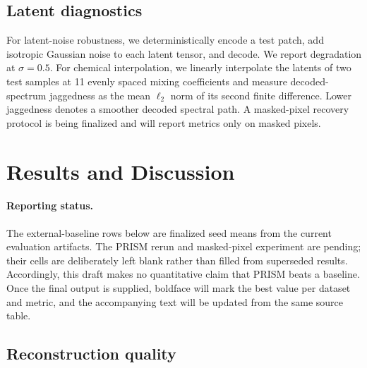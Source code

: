 \documentclass{article}
\begin{document}
\subsection{Latent diagnostics}

For latent-noise robustness, we deterministically encode a test patch, add isotropic Gaussian noise to each latent tensor, and decode. We report degradation at $\sigma=0.5$. For chemical interpolation, we linearly interpolate the latents of two test samples at 11 evenly spaced mixing coefficients and measure decoded-spectrum jaggedness as the mean $\ell_2$ norm of its second finite difference. Lower jaggedness denotes a smoother decoded spectral path. A masked-pixel recovery protocol is being finalized and will report metrics only on masked pixels.

\section{Results and Discussion}

\paragraph{Reporting status.} The external-baseline rows below are finalized seed means from the current evaluation artifacts. The PRISM rerun and masked-pixel experiment are pending; their cells are deliberately left blank rather than filled from superseded results. Accordingly, this draft makes no quantitative claim that PRISM beats a baseline. Once the final output is supplied, boldface will mark the best value per dataset and metric, and the accompanying text will be updated from the same source table.

\subsection{Reconstruction quality}
\end{document}
